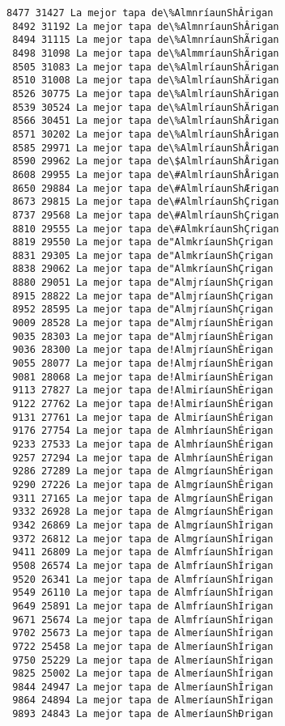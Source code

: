 \documentclass[11pt]{article}
\begin{document}
\begin{Verbatim}[commandchars=\\\{\}]
 8477 31427 La mejor tapa de\%AlmnríaunShÂrigan
 8492 31192 La mejor tapa de\%AlmnríaunShÂrigan
 8494 31115 La mejor tapa de\%AlmnríaunShÃrigan
 8498 31098 La mejor tapa de\%AlmmríaunShÃrigan
 8505 31083 La mejor tapa de\%AlmlríaunShÃrigan
 8510 31008 La mejor tapa de\%AlmlríaunShÄrigan
 8526 30775 La mejor tapa de\%AlmlríaunShÄrigan
 8539 30524 La mejor tapa de\%AlmlríaunShÄrigan
 8566 30451 La mejor tapa de\%AlmlríaunShÅrigan
 8571 30202 La mejor tapa de\%AlmlríaunShÅrigan
 8585 29971 La mejor tapa de\%AlmlríaunShÅrigan
 8590 29962 La mejor tapa de\$AlmlríaunShÅrigan
 8608 29955 La mejor tapa de\#AlmlríaunShÅrigan
 8650 29884 La mejor tapa de\#AlmlríaunShÆrigan
 8673 29815 La mejor tapa de\#AlmlríaunShÇrigan
 8737 29568 La mejor tapa de\#AlmlríaunShÇrigan
 8810 29555 La mejor tapa de\#AlmkríaunShÇrigan
 8819 29550 La mejor tapa de"AlmkríaunShÇrigan
 8831 29305 La mejor tapa de"AlmkríaunShÇrigan
 8838 29062 La mejor tapa de"AlmkríaunShÇrigan
 8880 29051 La mejor tapa de"AlmjríaunShÇrigan
 8915 28822 La mejor tapa de"AlmjríaunShÇrigan
 8952 28595 La mejor tapa de"AlmjríaunShÇrigan
 9009 28528 La mejor tapa de"AlmjríaunShÈrigan
 9035 28303 La mejor tapa de"AlmjríaunShÈrigan
 9036 28300 La mejor tapa de!AlmjríaunShÈrigan
 9055 28077 La mejor tapa de!AlmjríaunShÈrigan
 9081 28068 La mejor tapa de!AlmiríaunShÈrigan
 9113 27827 La mejor tapa de!AlmiríaunShÈrigan
 9122 27762 La mejor tapa de!AlmiríaunShÉrigan
 9131 27761 La mejor tapa de AlmiríaunShÉrigan
 9176 27754 La mejor tapa de AlmhríaunShÉrigan
 9233 27533 La mejor tapa de AlmhríaunShÉrigan
 9257 27294 La mejor tapa de AlmhríaunShÉrigan
 9286 27289 La mejor tapa de AlmgríaunShÉrigan
 9290 27226 La mejor tapa de AlmgríaunShÊrigan
 9311 27165 La mejor tapa de AlmgríaunShËrigan
 9332 26928 La mejor tapa de AlmgríaunShËrigan
 9342 26869 La mejor tapa de AlmgríaunShÌrigan
 9372 26812 La mejor tapa de AlmgríaunShÍrigan
 9411 26809 La mejor tapa de AlmfríaunShÍrigan
 9508 26574 La mejor tapa de AlmfríaunShÍrigan
 9520 26341 La mejor tapa de AlmfríaunShÍrigan
 9549 26110 La mejor tapa de AlmfríaunShÍrigan
 9649 25891 La mejor tapa de AlmfríaunShÍrigan
 9671 25674 La mejor tapa de AlmfríaunShÍrigan
 9702 25673 La mejor tapa de AlmeríaunShÍrigan
 9722 25458 La mejor tapa de AlmeríaunShÍrigan
 9750 25229 La mejor tapa de AlmeríaunShÍrigan
 9825 25002 La mejor tapa de AlmeríaunShÍrigan
 9844 24947 La mejor tapa de AlmeríaunShÎrigan
 9864 24894 La mejor tapa de AlmeríaunShÏrigan
 9893 24843 La mejor tapa de AlmeríaunShÐrigan

\end{Verbatim}
\end{document}
